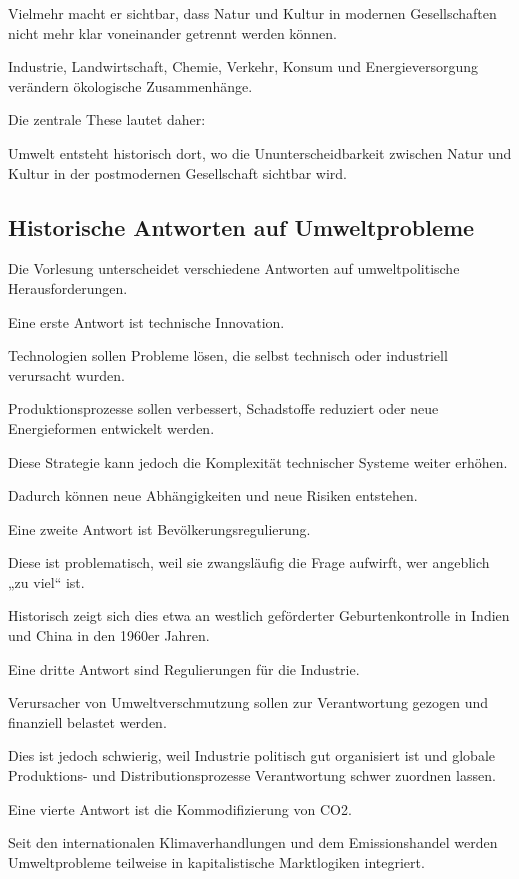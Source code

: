 Vielmehr macht er sichtbar,
dass Natur und Kultur
in modernen Gesellschaften
nicht mehr klar voneinander getrennt werden können.

Industrie,
Landwirtschaft,
Chemie,
Verkehr,
Konsum
und Energieversorgung
verändern ökologische Zusammenhänge.

Die zentrale These lautet daher:

Umwelt entsteht historisch dort,
wo die Ununterscheidbarkeit
zwischen Natur und Kultur
in der postmodernen Gesellschaft
sichtbar wird.

\subsection{Historische Antworten auf Umweltprobleme}

Die Vorlesung unterscheidet verschiedene Antworten
auf umweltpolitische Herausforderungen.

Eine erste Antwort ist technische Innovation.

Technologien sollen Probleme lösen,
die selbst technisch oder industriell verursacht wurden.

Produktionsprozesse sollen verbessert,
Schadstoffe reduziert
oder neue Energieformen entwickelt werden.

Diese Strategie kann jedoch
die Komplexität technischer Systeme weiter erhöhen.

Dadurch können neue Abhängigkeiten
und neue Risiken entstehen.

Eine zweite Antwort ist Bevölkerungsregulierung.

Diese ist problematisch,
weil sie zwangsläufig die Frage aufwirft,
wer angeblich „zu viel“ ist.

Historisch zeigt sich dies etwa
an westlich geförderter Geburtenkontrolle
in Indien und China in den 1960er Jahren.

Eine dritte Antwort sind Regulierungen für die Industrie.

Verursacher von Umweltverschmutzung
sollen zur Verantwortung gezogen
und finanziell belastet werden.

Dies ist jedoch schwierig,
weil Industrie politisch gut organisiert ist
und globale Produktions-
und Distributionsprozesse
Verantwortung schwer zuordnen lassen.

Eine vierte Antwort ist die Kommodifizierung von CO2.

Seit den internationalen Klimaverhandlungen
und dem Emissionshandel
werden Umweltprobleme teilweise
in kapitalistische Marktlogiken integriert.

